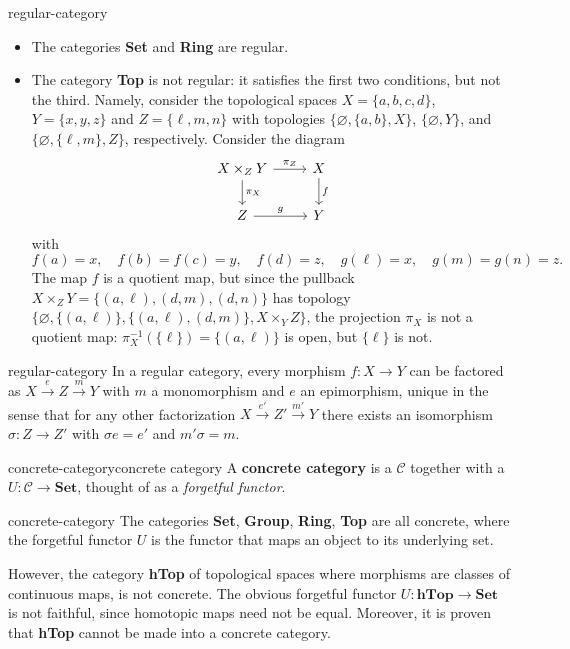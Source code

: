\begin{example}{regular-category}
    \begin{itemize}
        \item The categories \textbf{Set} and \textbf{Ring} are regular.
        \item The category \textbf{Top} is not regular: it satisfies the first two conditions, but not the third. Namely, consider the topological spaces $X = \{ a, b, c, d \}$, $Y = \{ x, y, z \}$ and $Z = \{ \ell, m, n \}$ with topologies $\{ \varnothing, \{ a, b \}, X \}$, $\{ \varnothing, Y \}$, and $\{ \varnothing, \{ \ell, m \}, Z \}$, respectively. Consider the diagram
        \[ \begin{tikzcd} X \times_Z Y \arrow{r}{\pi_Z} \arrow{d}{\pi_X} & X \arrow{d}{f} \\ Z \arrow{r}{g} & Y \end{tikzcd} \]
        with
        \[ f(a) = x, \quad f(b) = f(c) = y, \quad f(d) = z, \quad g(\ell) = x, \quad g(m) = g(n) = z . \]
        The map $f$ is a quotient map, but since the pullback $X \times_Z Y = \{ (a, \ell), (d, m), (d, n) \}$ has topology $\{ \varnothing, \{ (a, \ell) \}, \{ (a, \ell), (d, m) \} , X \times_Y Z \}$, the projection $\pi_X$ is not a quotient map: $\pi_X^{-1}(\{ \ell \}) = \{ (a, \ell) \}$ is open, but $\{ \ell \}$ is not.
    \end{itemize}
\end{example}

\begin{example}{regular-category}
    In a regular category, every morphism $f : X \to Y$ can be factored as $X \xrightarrow{e} Z \xrightarrow{m} Y$ with $m$ a monomorphism and $e$ an epimorphism, unique in the sense that for any other factorization $X \xrightarrow{e'} Z' \xrightarrow{m'} Y$ there exists an isomorphism $\sigma : Z \to Z'$ with $\sigma e = e'$ and $m' \sigma = m$.
\end{example}

\begin{topic}{concrete-category}{concrete category}
    A \textbf{concrete category} is a  $\mathcal{C}$ together with a  $U : \mathcal{C} \to \textbf{Set}$, thought of as a \textit{forgetful functor}.
\end{topic}

\begin{example}{concrete-category}
    The categories \textbf{Set}, \textbf{Group}, \textbf{Ring}, \textbf{Top} are all concrete, where the forgetful functor $U$ is the functor that maps an object to its underlying set.
    
    However, the category \textbf{hTop} of topological spaces where morphisms are  classes of continuous maps, is not concrete. The obvious forgetful functor $U : \textbf{hTop} \to \textbf{Set}$ is not faithful, since homotopic maps need not be equal. Moreover, it is proven that \textbf{hTop} cannot be made into a concrete category.
\end{example}

